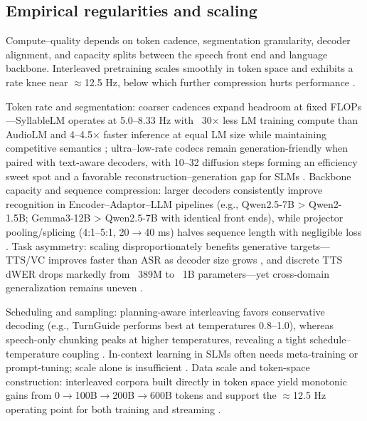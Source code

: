 \documentclass{article}
\begin{document}
\subsection{Empirical regularities and scaling} \label{subsec:empiricalregularitiesandscaling}
Compute--quality depends on token cadence, segmentation granularity, decoder alignment, and capacity splits between the speech front end and language backbone. Interleaved pretraining scales smoothly in token space and exhibits a rate knee near $\approx$12.5 Hz, below which further compression hurts performance \cite{zeng2024scalingspeechtextpretrainingsyntheticint}.

Token rate and segmentation: coarser cadences expand headroom at fixed FLOPs---SyllableLM operates at 5.0--8.33 Hz with ~30$\times$ less LM training compute than AudioLM and 4--4.5$\times$ faster inference at equal LM size while maintaining competitive semantics \cite{baade2024syllablelmlearningcoarsesemanticunitsspe}; ultra--low-rate codecs remain generation-friendly when paired with text-aware decoders, with 10--32 diffusion steps forming an efficiency sweet spot and a favorable reconstruction--generation gap for SLMs \cite{wang2025tadicodectextawarediffusionspeechtokeniz}. Backbone capacity and sequence compression: larger decoders consistently improve recognition in Encoder--Adaptor--LLM pipelines (e.g., Qwen2.5-7B > Qwen2-1.5B; Gemma3-12B > Qwen2.5-7B with identical front ends), while projector pooling/splicing (4:1--5:1, 20$\rightarrow$40 ms) halves sequence length with negligible loss \cite{li2025transsionmultilingualspeechrecognitionsy,nguyen2025qwenvsgemmaintegrationwhispercomparative}. Task asymmetry: scaling disproportionately benefits generative targets---TTS/VC improves faster than ASR as decoder size grows \cite{wu2024speechcomposerunifyingmultiplespeechtask}, and discrete TTS dWER drops markedly from ~389M to ~1B parameters---yet cross-domain generalization remains uneven \cite{wang2024evaluatingtextspeechsynthesislargediscre,huang2025dynamicsuperbphase2collaborativelyexpand}.

Scheduling and sampling: planning-aware interleaving favors conservative decoding (e.g., TurnGuide performs best at temperatures 0.8--1.0), whereas speech-only chunking peaks at higher temperatures, revealing a tight schedule--temperature coupling \cite{cui2025thinkbeforeyoutalkenhancingmeaningfuldia}. In-context learning in SLMs often needs meta-training or prompt-tuning; scale alone is insufficient \cite{hsu2024exploringcontextlearningtextlessspeechla}. Data scale and token-space construction: interleaved corpora built directly in token space yield monotonic gains from 0$\rightarrow$100B$\rightarrow$200B$\rightarrow$600B tokens and support the $\approx$12.5 Hz operating point for both training and streaming \cite{zeng2024scalingspeechtextpretrainingsyntheticint}.
\end{document}
